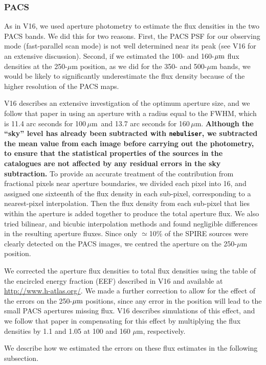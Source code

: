 \documentclass[a4paper,fleqn,usenatbib, twocolumn]{aastex61}
\def\mic{\,$\mu $m}
\begin{document}
\subsubsection{PACS}

As in V16, we used aperture photometry to estimate the flux densities
in the two PACS bands. We did this for two reasons. First, the PACS
PSF for our observing mode (fast-parallel scan mode) is not well
determined near its peak (see V16 for an extensive
discussion). Second, if we estimated the 100- and 160-$\mbox{$\mu$m}$ flux
densities at the 250-$\mu$m position, as we did for the 350- and
500-$\mu$m bands, we would be likely to significantly underestimate
the flux density because of the higher resolution of the PACS maps.

V16 describes an extensive investigation of the optimum aperture size,
and we follow that paper in using an aperture with a radius equal to
the FWHM, which is 11.4 arc seconds for 100\mic\ and 13.7 arc seconds
for 160\mic. {\bf Although the ``sky'' level has already been subtracted with
{\tt nebuliser}, we subtracted the mean value from each image before
carrying out the photometry,
to ensure that the statistical properties of the sources in the catalogues
are not affected by any residual errors in the sky subtraction.}
To
provide an accurate treatment of the contribution from fractional
pixels near aperture boundaries, we divided each pixel into 16, and
assigned one sixteenth of the flux density in each sub-pixel,
corresponding to a nearest-pixel interpolation. Then the flux density
from each sub-pixel that lies within the aperture is added together to
produce the total aperture flux.  We also tried bilinear, and bicubic
interpolation methods and found negligible differences in the
resulting aperture fluxes.  Since only $\simeq$10\% of the SPIRE
sources were clearly detected on the PACS images, we centred the
aperture on the 250-$\mu$m position.

We corrected the aperture flux densities to total flux densities using
the table of the encircled energy fraction (EEF) described in V16 and
available at \url{http://www.h-atlas.org/}.  We made a further
correction to allow for the effect of the errors on the 250-$\mbox{$\mu$m}$
positions, since any error in the position will lead to the small PACS
apertures missing flux. V16 describes simulations of this effect, and
we follow that paper in compensating for this effect by multiplying
the flux densities by 1.1 and 1.05 at 100 and 160 $\mu$m,
respectively.

We describe how we estimated the errors on these flux estimates in the
following subsection.
\end{document}

